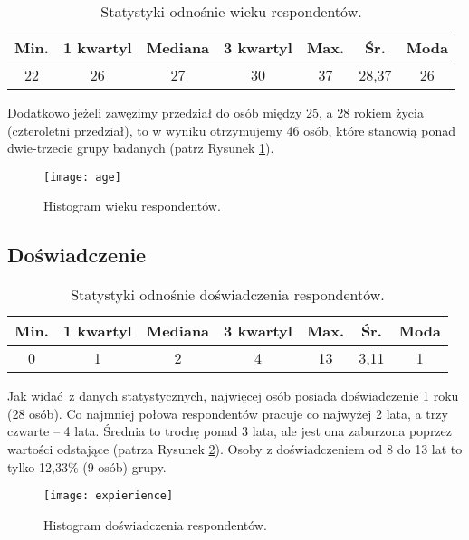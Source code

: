 \begin{table}[h!]
\begin{center}
\begin{tabular}{c c c c c c c}
Min. & 1 kwartyl & Mediana & 3 kwartyl & Max. & Śr. & Moda \\ \hline
22 & 26 & 27 & 30 & 37 & 28,37 & 26 \\
\end{tabular}
\end{center}
\caption{Statystyki odnośnie wieku respondentów.}
\label{tab:age-stats}
\end{table}

Dodatkowo jeżeli zawęzimy przedział do osób między 25, a 28 rokiem życia (czteroletni przedział), to w wyniku otrzymujemy 46 osób, które stanowią ponad dwie-trzecie grupy badanych (patrz Rysunek \ref{fig:age}).

\begin{figure}[h]
\begin{center}
\texttt{[image: age]}
\end{center}
\caption{Histogram wieku respondentów.}
\label{fig:age}
\end{figure}

\subsection{Doświadczenie}

\begin{table}[h!]
\begin{center}
\begin{tabular}{c c c c c c c}
Min. & 1 kwartyl & Mediana & 3 kwartyl & Max. & Śr. & Moda \\ \hline
0 & 1 & 2 & 4 & 13 & 3,11 & 1 \\
\end{tabular}
\end{center}
\caption{Statystyki odnośnie doświadczenia respondentów.}
\label{tab:expierience-stats}
\end{table}

Jak widać z danych statystycznych, najwięcej osób posiada doświadczenie 1 roku (28 osób). Co najmniej połowa respondentów pracuje co najwyżej 2 lata, a trzy czwarte -- 4 lata. Średnia to trochę ponad 3 lata, ale jest ona zaburzona poprzez wartości odstające (patrza Rysunek \ref{fig:expierience}). Osoby z doświadczeniem od 8 do 13 lat to tylko 12,33\% (9 osób) grupy.

\begin{figure}[h]
\begin{center}
\texttt{[image: expierience]}
\end{center}
\caption{Histogram doświadczenia respondentów.}
\label{fig:expierience}
\end{figure}

